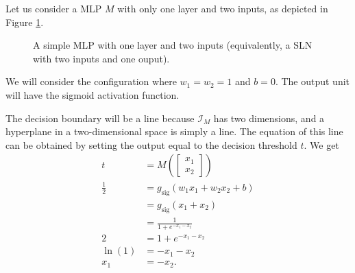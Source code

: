 \begin{example}
    Let us consider a MLP $M$ with only one layer and two inputs, as depicted in Figure \ref{fig:sln_2_in_1_out}.
    \begin{figure}
        \begin{center}
        \end{center}
        \caption{A simple MLP with one layer and two inputs (equivalently, a SLN with two inputs and one ouput).}
        \label{fig:sln_2_in_1_out}
    \end{figure}
    We will consider the configuration where $w_1=w_2=1$ and $b=0$. 
    The output unit will have the sigmoid activation function.
    
    The decision boundary will be a line because $\mathcal{I}_M$ has two dimensions, and a hyperplane in a two-dimensional space is simply a line.
    The equation of this line can be obtained by setting the output equal to the decision threshold $t$.
    We get
    \begin{align*}
        t &= M\left(\begin{bmatrix}
            x_1 \\ x_2
        \end{bmatrix}\right) \\
        \frac{1}{2} &= g_\text{sig}\left(w_1 x_1 + w_2 x_2 + b\right) \\
        &= g_\text{sig}\left(x_1 + x_2\right) \\
        &= \frac{1}{1+e^{-x_1-x_2}} \\
        2 &= 1+e^{-x_1-x_2} \\
        \ln\left(1\right) &= -x_1-x_2 \\
        x_1 &= -x_2.
    \end{align*}
    

\end{example}
